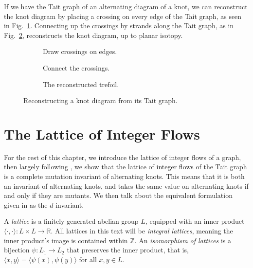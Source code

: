 \documentclass[12pt]{report}
\newcommand{\R}{\mathbb{R}}
\newcommand{\Z}{\mathbb{Z}}
\newcommand{\ip}[2]{\langle #1, #2 \rangle}
\theoremstyle{upright}
\begin{document}
If we have the Tait graph of an alternating diagram of a knot, we can reconstruct the knot diagram by placing a crossing on every edge of the Tait graph, as seen in Fig.~\ref{fig:trefoil-tait-with-crossings}. Connecting up the crossings by strands along the Tait graph, as in Fig.~\ref{fig:trefoil-resconstructed},	 reconstructs the knot diagram, up to planar isotopy.

\begin{figure}[h]
	\centering
	\hspace*{\fill}
	\begin{subfigure}[b]{0.3 \textwidth}
		\centering
		\def\svgscale{0.22}
		
		\caption{Draw crossings on edges.}
		\label{fig:trefoil-tait-with-crossings}
	\end{subfigure}
	\hspace*{\fill}
	\begin{subfigure}[b]{0.3 \textwidth}
		\centering
		\def\svgscale{0.22}
		
		\caption{Connect the crossings.}
		\label{fig:trefoil-resconstructed}
	\end{subfigure}
	\hspace*{\fill}
	\begin{subfigure}[b]{0.3 \textwidth}
		\centering
		\def\svgscale{0.2}
		
		\caption{The reconstructed trefoil.}
		\label{fig:trefoil-resconstructed-isotopy}
	\end{subfigure}
	\hspace*{\fill}
	\caption{Reconstructing a knot diagram from its Tait graph.}
	\label{fig:tait-reconstruction-example}
\end{figure}

\section{The Lattice of Integer Flows}

For the rest of this chapter, we introduce the lattice of integer flows of a graph, then largely following \cite{lattices-graphs-mutation}, we show that the lattice of integer flows of the Tait graph is a complete mutation invariant of alternating knots. This means that it is both an invariant of alternating knots, and takes the same value on alternating knots if and only if they are mutants. We then talk about the equivalent formulation given in \cite{lattices-graphs-mutation} as the $d$-invariant.

A \textit{lattice} is a finitely generated abelian group $L$, equipped with an inner product 
\({\ip{\cdot}{\cdot}: L \times L \longrightarrow \R}\). All lattices in this text will be \textit{integral lattices}, meaning the inner product's image is contained within $\Z$. An \textit{isomorphism of lattices} is a bijection $\psi: L_{1} \longrightarrow L_{2}$ that preserves the inner product, that is, ${\ip{x}{y} = \ip{\psi(x)}{\psi(y)}}$ for all $x, y \in L$.
\end{document}
